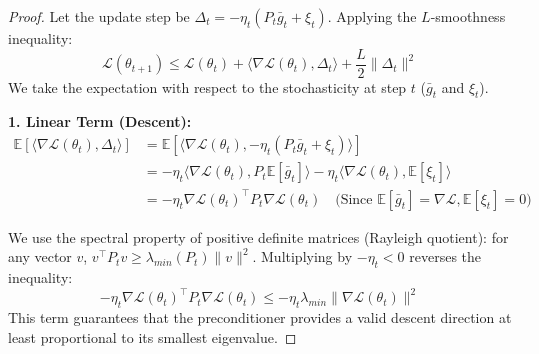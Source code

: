 \documentclass{article}
\theoremstyle{plain}
\theoremstyle{definition}
\theoremstyle{remark}
\begin{document}
\begin{proof}
Let the update step be $\Delta_t = -\eta_t (P_t \bar{g}_t + \xi_t)$. Applying the $L$-smoothness inequality:
\begin{equation}
    \mathcal{L}(\theta_{t+1}) \le \mathcal{L}(\theta_t) + \langle \nabla \mathcal{L}(\theta_t), \Delta_t \rangle + \frac{L}{2} \|\Delta_t\|^2
\end{equation}
We take the expectation with respect to the stochasticity at step $t$ ($\bar{g}_t$ and $\xi_t$).

\textbf{1. Linear Term (Descent):}
\begin{align}
    \mathbb{E}[\langle \nabla \mathcal{L}(\theta_t), \Delta_t \rangle] &= \mathbb{E}\left[ \langle \nabla \mathcal{L}(\theta_t), -\eta_t (P_t \bar{g}_t + \xi_t) \rangle \right] \\
    &= -\eta_t \langle \nabla \mathcal{L}(\theta_t), P_t \mathbb{E}[\bar{g}_t] \rangle - \eta_t \langle \nabla \mathcal{L}(\theta_t), \mathbb{E}[\xi_t] \rangle \\
    &= -\eta_t \nabla \mathcal{L}(\theta_t)^\top P_t \nabla \mathcal{L}(\theta_t) \quad \text{(Since } \mathbb{E}[\bar{g}_t] = \nabla \mathcal{L}, \mathbb{E}[\xi_t] = 0 \text{)}
\end{align}

We use the spectral property of positive definite matrices (Rayleigh quotient): for any vector $v$, $v^\top P_t v \ge \lambda_{min}(P_t) \|v\|^2$. Multiplying by $-\eta_t < 0$ reverses the inequality:
\begin{equation}
    -\eta_t \nabla \mathcal{L}(\theta_t)^\top P_t \nabla \mathcal{L}(\theta_t) \le -\eta_t \lambda_{min} \|\nabla \mathcal{L}(\theta_t)\|^2
\end{equation}
This term guarantees that the preconditioner provides a valid descent direction at least proportional to its smallest eigenvalue.


\end{proof}
\end{document}
